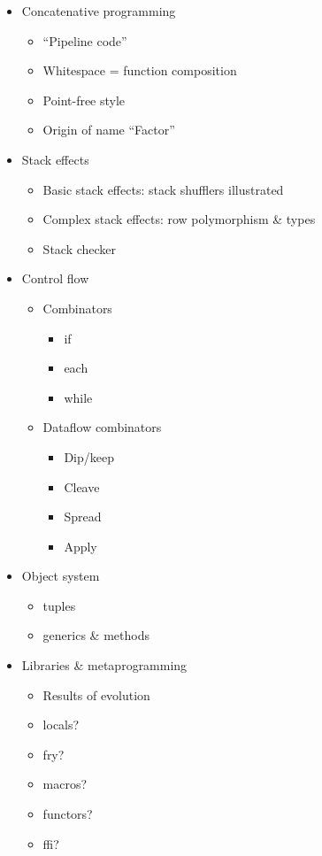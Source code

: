 \begin{itemize}

\item Concatenative programming
      \begin{itemize}
        \item ``Pipeline code''
        \item Whitespace = function composition
        \item Point-free style
        \item Origin of name ``Factor''
      \end{itemize}

\item Stack effects
      \begin{itemize}
        \item Basic stack effects: stack shufflers illustrated
        \item Complex stack effects: row polymorphism \& types
        \item Stack checker
      \end{itemize}

\item Control flow
      \begin{itemize}
        \item Combinators
              \begin{itemize}
                \item if
                \item each
                \item while
              \end{itemize}
        \item Dataflow combinators
              \begin{itemize}
                \item Dip/keep
                \item Cleave
                \item Spread
                \item Apply
              \end{itemize}
      \end{itemize}

\item Object system
      \begin{itemize}
        \item tuples
        \item generics \& methods
      \end{itemize}

\item Libraries \& metaprogramming
      \begin{itemize}
        \item Results of evolution
        \item locals?
        \item fry?
        \item macros?
        \item functors?
        \item ffi?
      \end{itemize}

\end{itemize}



